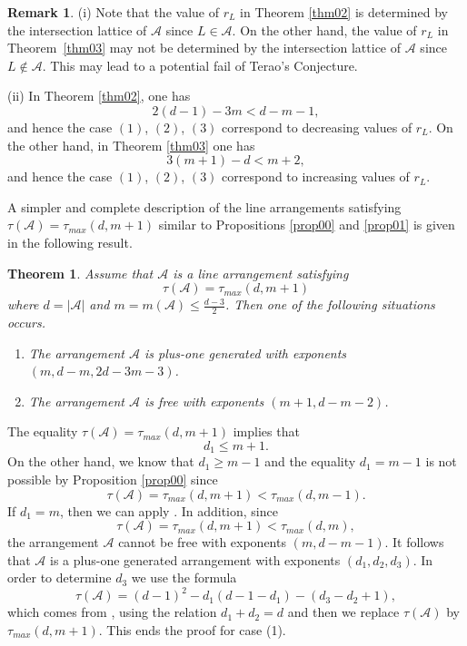 \documentclass[12pt]{amsart}
\theoremstyle{plain}
\newtheorem{thm}[subsection]{Theorem}
\theoremstyle{definition}
\newtheorem{rk}[subsection]{Remark}
\numberwithin{equation}{section}
\newcommand{\A}{{\mathcal A}}
\begin{document}
  \begin{rk}
\label{rk03}
(i) Note that the value of $r_L$ in Theorem \ref{thm02} is determined by the intersection lattice of $\A$ since $L \in \A$. On the other hand, the value of $r_L$ in Theorem~\ref{thm03} may not be determined by the intersection lattice of $\A$ since $L \notin \A$. This may lead to a potential fail of Terao's Conjecture.

(ii) In Theorem \ref{thm02}, one has
$$2(d-1)-3m <d-m-1,$$
and hence the case $(1)$, $(2)$, $(3)$ correspond to decreasing values of $r_L$. On the other hand, in Theorem \ref{thm03} one has
$$3(m+1)-d < m+2,$$
and hence the case $(1)$, $(2)$, $(3)$ correspond to increasing values of $r_L$.

 \end{rk}
 
 A simpler and complete description of the line arrangements satisfying
 $\tau(\A)=\tau_{max}(d,m+1)$ similar to Propositions \ref{prop00} and \ref{prop01} is given in the following result.
 
  \begin{thm}
\label{thmAe1}
Assume that $\A$ is a line arrangement satisfying
$$\tau(\A)=\tau_{max}(d,m+1)$$
where $d=|\A|$ and $m=m(\A)\leq \frac{d-3}{2}$. 
Then one of the following situations occurs.
\begin{enumerate} 
\item The arrangement $\A$ is plus-one generated with exponents $(m,d-m, 2d-3m-3)$.

\item The arrangement $\A$ is free with exponents $(m+1,d-m-2)$.
\end{enumerate} 
\end{thm}

\proof
The equality $\tau(\A)=\tau_{max}(d,m+1)$ implies that
$$d_1 \leq m+1.$$
On the other hand, we know that $d_1 \geq m-1$ and the equality
$d_1=m-1$ is not possible by Proposition \ref{prop00} since
$$\tau(\A)=\tau_{max}(d,m+1)<\tau_{max}(d,m-1).$$
If $d_1=m$, then we can apply  \cite[Theorem 1.12 (2)]{Der}. 
In addition, since
$$\tau(\A)=\tau_{max}(d,m+1)<\tau_{max}(d,m),$$
the arrangement $\A$ cannot be free with exponents $(m,d-m-1)$. It follows that $\A$ is a plus-one generated arrangement with exponents
$(d_1,d_2,d_3)$. In order to determine $d_3$ we use the formula
$$\tau(\A)=(d-1)^2-d_1(d-1-d_1)-(d_3-d_2+1),$$
which comes from \cite[Proposition 2.1 (4)]{3syz}, using the relation
$d_1+d_2=d$ and then we replace $\tau(\A)$ by $\tau_{max}(d,m+1)$.
This ends the proof for case (1). 
\end{document}
